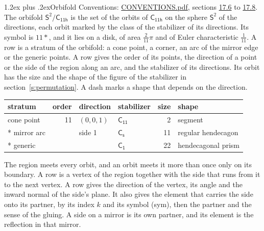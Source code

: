 \documentclass[10pt,a4paper]{article}
\makeatletter
\renewcommand\section{\@startsection{section}{1}{\z@}{-3ex plus -1ex minus -.2ex}%
  {1.2ex plus .2ex}{\normalfont\large\sffamily\bfseries\color{parttitle}}}
\numberwithin{equation}{section}
\newcommand{\grp}[1]{\mathsf{#1}}
\newcommand{\orbname}[1]{#1}
\newcommand{\dirvec}[3]{(#1, #2, #3)}
\newcommand{\twosphere}{\mathsf{S}^{2}}
\makeatother
\begin{document}
\section{Orbifold}\label{s:orbifold}
Conventions: \href{../../CONVENTIONS.pdf}{CONVENTIONS.pdf}, sections \href{../../CONVENTIONS.pdf\#conv.17.6}{17.6} to \href{../../CONVENTIONS.pdf\#conv.17.8}{17.8}.
The orbifold $\twosphere/\grp{C_{11h}}$ is the set of the orbits of $\grp{C_{11h}}$ on the sphere $\twosphere$ of the directions, each orbit marked by the class of the stabilizer of its directions. Its symbol is $\orbname{11{\ast}}$, and it lies on a disk, of area $\tfrac{2}{11}\pi$ and of Euler characteristic $\tfrac{1}{11}$.
\leavevmode\label{n:head.stratum}\label{n:head.order.point}\label{n:head.direction}\label{n:head.stabilizer}\label{n:head.size.orbit}\label{n:head.shape}A row is a stratum of the orbifold: a cone point, a corner, an arc of the mirror edge or the generic points. A row gives the order of its points, the direction of a point or the side of the region along an arc, and the stabilizer of its directions. Its orbit has the size and the shape of the figure of the stabilizer in section~\ref{s:permutation}. A dash marks a shape that depends on the direction.
{\small\setlength{\tabcolsep}{4pt}\begin{longtable}{@{}lrllrl@{}}\toprule
stratum & order & direction & stabilizer & size & shape\\\midrule\endhead
\bottomrule\endfoot\endlastfoot
cone point & 11 & $\dirvec{0}{0}{1}$ & \href{C11.pdf}{$\grp{C_{11}}$} & 2 & segment\\*
mirror arc &  & side 1 & \href{C1v.pdf}{$\grp{C_{s}}$} & 11 & regular hendecagon\\*
generic &  &  & \href{C1.pdf}{$\grp{C_{1}}$} & 22 & hendecagonal prism\\
\bottomrule\end{longtable}}
\leavevmode\label{n:head.vertex.region}\label{n:head.angle}\label{n:head.normal.side}\label{n:head.partner}\label{n:head.sense}The region meets every orbit, and an orbit meets it more than once only on its boundary. A row is a vertex of the region together with the side that runs from it to the next vertex. A row gives the direction of the vertex, its angle and the inward normal of the side's plane. It also gives the element that carries the side onto its partner, by its index $k$ and its symbol (sym), then the partner and the sense of the gluing. A side on a mirror is its own partner, and its element is the reflection in that mirror.
\end{document}
